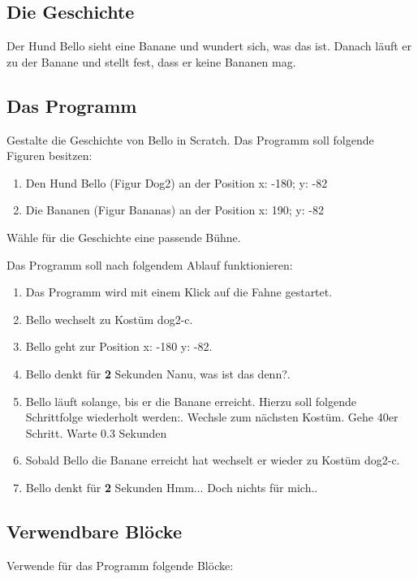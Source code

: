 \documentclass[a4paper, 12pt]{article}
\begin{document}
\large
\TITEL

\subsection*{Die Geschichte}
Der Hund Bello sieht eine Banane und wundert sich, was das ist. Danach läuft er zu der Banane und stellt fest, dass er keine Bananen mag.

\subsection*{Das Programm}
Gestalte die Geschichte von Bello in Scratch. Das Programm soll folgende Figuren besitzen:
\begin{enumerate}
	\item Den Hund Bello (Figur Dog2) an der Position x: -180; y: -82
	\item Die Bananen (Figur Bananas) an der Position x: 190; y: -82
\end{enumerate}
\vspace{1em}
Wähle für die Geschichte eine passende Bühne.
\vspace{1em}

Das Programm soll nach folgendem Ablauf funktionieren:

\begin{enumerate}
	\item Das Programm wird mit einem Klick auf die Fahne gestartet.
	\item Bello wechselt zu Kostüm \glqq{}dog2-c\grqq{}.
	\item Bello geht zur Position \glqq{}x: -180 y: -82\grqq{}.
	\item Bello denkt für \textbf{2} Sekunden \glqq{}Nanu, was ist das denn?\grqq{}.
	\item Bello läuft solange, bis er die Banane erreicht. Hierzu soll folgende Schrittfolge wiederholt werden:. Wechsle zum nächsten Kostüm. Gehe 40er Schritt. Warte 0.3 Sekunden
	\item Sobald Bello die Banane erreicht hat wechselt er wieder zu Kostüm \glqq{}dog2-c\grqq{}.
	\item Bello denkt für \textbf{2} Sekunden \glqq{}Hmm... Doch nichts für mich.\grqq{}.
\end{enumerate}

\subsection*{Verwendbare Blöcke}
Verwende für das Programm folgende Blöcke:
\end{document}
